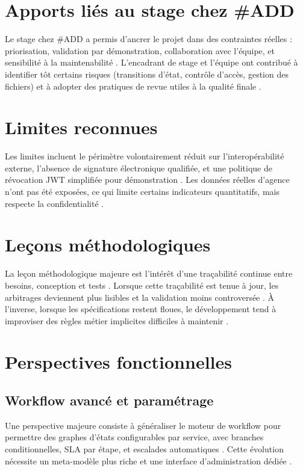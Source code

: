 \section{Apports liés au stage chez \#ADD}

Le stage chez \#ADD a permis d'ancrer le projet dans des contraintes réelles : priorisation, validation par démonstration, collaboration avec l'équipe, et sensibilité à la maintenabilité \cite{bass2021}. L'encadrant de stage et l'équipe ont contribué à identifier tôt certains risques (transitions d'état, contrôle d'accès, gestion des fichiers) et à adopter des pratiques de revue utiles à la qualité finale \cite{pressman2014}.

\section{Limites reconnues}

Les limites incluent le périmètre volontairement réduit sur l'interopérabilité externe, l'absence de signature électronique qualifiée, et une politique de révocation JWT simplifiée pour démonstration \cite{rfc7519,owasp2021}. Les données réelles d'agence n'ont pas été exposées, ce qui limite certains indicateurs quantitatifs, mais respecte la confidentialité \cite{iso25010}.

\section{Leçons méthodologiques}

La leçon méthodologique majeure est l'intérêt d'une traçabilité continue entre besoins, conception et tests \cite{ieee1012,sommerville2016}. Lorsque cette traçabilité est tenue à jour, les arbitrages deviennent plus lisibles et la validation moins controversée \cite{pressman2014}. À l'inverse, lorsque les spécifications restent floues, le développement tend à improviser des règles métier implicites difficiles à maintenir \cite{fowler2002}.

\section{Perspectives fonctionnelles}

\subsection{Workflow avancé et paramétrage}

Une perspective majeure consiste à généraliser le moteur de workflow pour permettre des graphes d'états configurables par service, avec branches conditionnelles, SLA par étape, et escalades automatiques \cite{bass2021}. Cette évolution nécessite un meta-modèle plus riche et une interface d'administration dédiée \cite{sommerville2016}.

